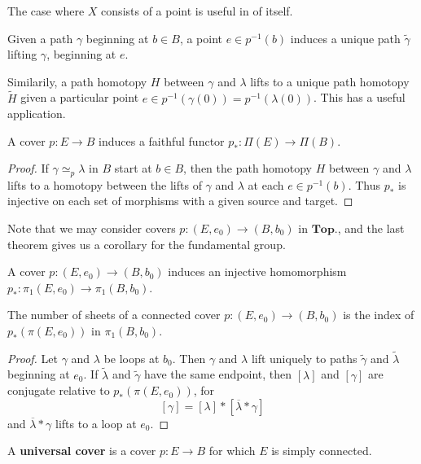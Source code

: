 The case where $X$ consists of a point is useful in of itself.

\begin{corollary}
    Given a path $\gamma$ beginning at $b \in B$, a point $e \in p^{-1}(b)$ induces a unique path $\tilde{\gamma}$ lifting $\gamma$, beginning at $e$.
\end{corollary}

Similarily, a path homotopy $H$ between $\gamma$ and $\lambda$ lifts to a unique path homotopy $\tilde{H}$ given a particular point $e \in p^{-1}(\gamma(0)) = p^{-1}(\lambda(0))$. This has a useful application.

\begin{theorem}
    A cover $p: E \to B$ induces a faithful functor $p_*: \Pi(E) \to \Pi(B)$.
\end{theorem}
\begin{proof}
    If $\gamma \simeq_p \lambda$ in $B$ start at $b \in B$, then the path homotopy $H$ between $\gamma$ and $\lambda$ lifts to a homotopy between the lifts of $\gamma$ and $\lambda$ at each $e \in p^{-1}(b)$. Thus $p_*$ is injective on each set of morphisms with a given source and target.
\end{proof}

Note that we may consider covers $p: (E,e_0) \to (B,b_0)$ in $\textbf{Top.}$, and the last theorem gives us a corollary for the fundamental group.

\begin{corollary}
    A cover $p: (E,e_0) \to (B,b_0)$ induces an injective homomorphism $p_*: \pi_1(E,e_0) \to \pi_1(B,b_0)$.
\end{corollary}

\begin{theorem}
    The number of sheets of a connected cover $p: (E,e_0) \to (B,b_0)$ is the index of $p_*(\pi(E,e_0))$ in $\pi_1(B,b_0)$.
\end{theorem}
\begin{proof}
    Let $\gamma$ and $\lambda$ be loops at $b_0$. Then $\gamma$ and $\lambda$ lift uniquely to paths $\tilde{\gamma}$ and $\tilde{\lambda}$ beginning at $e_0$. If $\tilde{\lambda}$ and $\tilde{\gamma}$ have the same endpoint, then $[\lambda]$ and $[\gamma]$ are conjugate relative to $p_*(\pi(E,e_0))$, for
    \[ [\gamma] = [\lambda] * [\overline{\lambda} * \gamma] \]
    and $\overline{\lambda} * \gamma$ lifts to a loop at $e_0$.
\end{proof}

A {\bf universal cover} is a cover $p: E \to B$ for which $E$ is simply connected.

